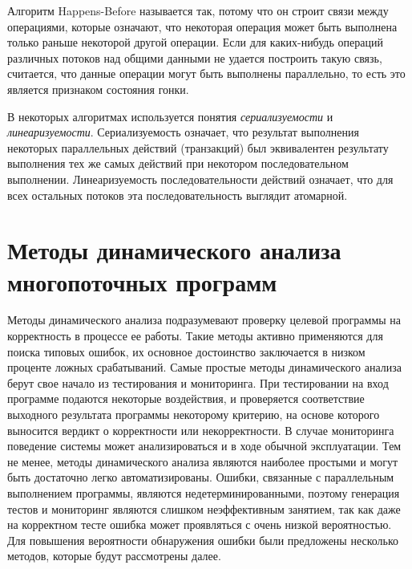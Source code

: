 Алгоритм Happens-Before называется так, потому что он строит связи между операциями, которые означают, что некоторая операция может быть выполнена только раньше некоторой другой операции.
Если для каких-нибудь операций различных потоков над общими данными не удается построить такую связь, считается, что данные операции могут быть выполнены параллельно, то есть это является признаком состояния гонки.

В некоторых алгоритмах используется понятия \textit{сериализуемости} и \textit{линеаризуемости}.
Сериализуемость означает, что результат выполнения некоторых параллельных действий (транзакций) был эквивалентен результату выполнения тех же самых действий при некотором последовательном выполнении.
Линеаризуемость последовательности действий означает, что для всех остальных потоков эта последовательность выглядит атомарной.

\section{Методы динамического анализа многопоточных программ}
\label{rw:dynamic}

Методы динамического анализа подразумевают проверку целевой программы на корректность в процессе ее работы.
Такие методы активно применяются для поиска типовых ошибок, их основное достоинство заключается в низком проценте ложных срабатываний.
Самые простые методы динамического анализа берут свое начало из тестирования и мониторинга.
При тестировании на вход программе подаются некоторые воздействия, и проверяется соответствие выходного результата программы некоторому критерию, на основе которого выносится вердикт о корректности или некорректности.
В случае мониторинга поведение системы может анализироваться и в ходе обычной эксплуатации.
Тем не менее, методы динамического анализа являются наиболее простыми и могут быть достаточно легко автоматизированы.
Ошибки, связанные с параллельным выполнением программы, являются недетерминированными, поэтому генерация тестов и мониторинг являются слишком неэффективным занятием, так как даже на корректном тесте ошибка может проявляться с очень низкой вероятностью.
Для повышения вероятности обнаружения ошибки были предложены несколько методов, которые будут рассмотрены далее.


